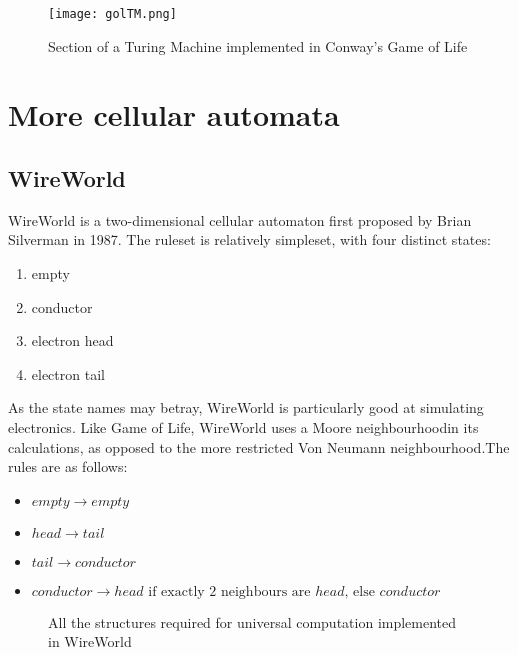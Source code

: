 \documentclass[11pt,a4paper]{article}
\begin{document}
    \begin{figure}[h]
        \centering
        \texttt{[image: golTM.png]}
        \caption{Section of a Turing Machine implemented in Conway's Game of
        Life}
        \label{fig:golTM}
    \end{figure}

\section{More cellular automata}
    \subsection{WireWorld}
    WireWorld is a two-dimensional cellular automaton first proposed by Brian
    Silverman in 1987. The ruleset is relatively simpleset, with four distinct
    states:
    \begin{enumerate}
        \item empty
        \item conductor
        \item electron head
        \item electron tail
    \end{enumerate}

    As the state names may betray, WireWorld is particularly good at simulating
    electronics. Like Game of Life, WireWorld uses a Moore neighbourhoodin its
    calculations, as opposed to the more restricted Von Neumann
    neighbourhood.The rules are as follows:
    \begin{itemize}
        \item $empty \rightarrow empty$
        \item $head \rightarrow tail$
        \item $tail \rightarrow conductor$
        \item $conductor \rightarrow head \text{ if exactly 2 neighbours are
            $head$, else } conductor$
    \end{itemize}

    \begin{figure}[h]%
        \centering {}%
        \qquad
        \caption{All the structures required for universal computation implemented in WireWorld}%
        \label{fig:nature_fractals}%
    \end{figure}
\end{document}
